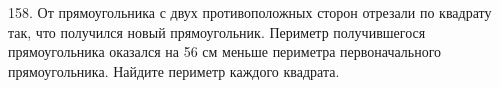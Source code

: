 158. От прямоугольника с двух противоположных сторон отрезали по квадрату так, что получился новый прямоугольник. Периметр получившегося прямоугольника оказался на 56 см меньше периметра первоначального прямоугольника. Найдите периметр каждого квадрата.\\
